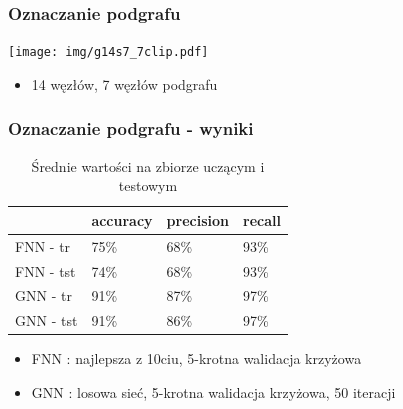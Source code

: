 \documentclass{beamer}
\begin{document}
\begin{frame}
\frametitle{Oznaczanie podgrafu}
\begin{center}
	\texttt{[image: img/g14s7\_7clip.pdf]}
\end{center}
\begin{itemize}
	\item 14 węzłów, 7 węzłów podgrafu
\end{itemize}
\end{frame}

\begin{frame}
\frametitle{Oznaczanie podgrafu - wyniki}
\setlength{\tabcolsep}{2pt}
\begin{table}[h!]
	\begin{center}
	\begin{tabular}{llll}
	\toprule
	& accuracy & precision & recall \\
	\midrule
	FNN - tr &	75\% &  68\% &  93\% \\
	FNN - tst &	74\% &  68\% &  93\% \\
	GNN - tr &	91\% &  87\% &  97\% \\
	GNN - tst &	91\% &  86\% &  97\% \\
	\bottomrule
	\end{tabular}
	\caption{Średnie wartości na zbiorze uczącym i testowym}
	\end{center}
\end{table}
\begin{itemize}
	\item FNN : najlepsza z 10ciu, 5-krotna walidacja krzyżowa
	\item GNN : losowa sieć, 5-krotna walidacja krzyżowa, 50 iteracji
\end{itemize}
\end{frame}
\end{document}
